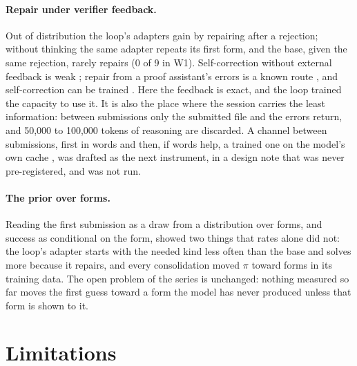 \documentclass[11pt]{article}
\begin{document}
\paragraph{Repair under verifier feedback.} Out of distribution the loop's
adapters gain by repairing after a rejection; without thinking the same
adapter repeats its first form, and the base, given the same rejection,
rarely repairs (0 of 9 in W1). Self-correction without external feedback
is weak \citep{huang2024selfcorrect}; repair from a proof assistant's
errors is a known route \citep{first2023baldur}, and self-correction can
be trained \citep{kumar2024score}. Here the feedback is exact, and the loop trained the capacity to use it. It is also the place where
the session carries the least information: between submissions only the
submitted file and the errors return, and 50,000 to 100,000 tokens of
reasoning are discarded. A channel between submissions, first in words
and then, if words help, a trained one on the model's own cache
\citep{fu2025c2c}, was drafted as the next instrument, in a design note
that was never pre-registered, and was not run.

\paragraph{The prior over forms.} Reading the first submission as a draw
from a distribution over forms, and success as conditional on the form,
showed two things that rates alone did not: the loop's adapter starts with
the needed kind less often than the base and solves more because it
repairs, and every consolidation moved $\pi$ toward forms in its training
data. The open problem of the series is unchanged: nothing measured so far
moves the first guess toward a form the model has never produced unless
that form is shown to it.

\section{Limitations}
\label{sec:limits}
\end{document}
